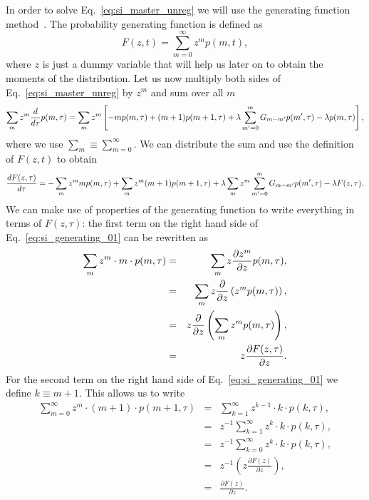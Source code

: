 In order to solve Eq.~\ref{eq:si_master_unreg} we will use the generating
function method~\cite{vanKampen2007}. The probability generating function
is defined as
\begin{equation}
F(z,t) = \sum_{m=0}^\infty z^m p(m,t),
\end{equation}
where $z$ is just a dummy variable that will help us later on to obtain the
moments of the distribution. Let us now multiply both sides of
Eq.~\ref{eq:si_master_unreg} by $z^m$ and sum over all $m$
\begin{equation}
\sum_m z^m {d \over d\tau} p(m, \tau) = 
\sum_m z^m \left[ 
- m p(m, \tau) 
+ (m + 1) p(m + 1, \tau) 
+ \lambda \sum_{m' = 0}^m G_{m-m'} p(m', \tau) - \lambda p(m, \tau)
\right],
\end{equation}
where we use $\sum_m \equiv \sum_{m=0}^\infty$. We can distribute the sum and
use the definition of $F(z, t)$ to obtain
\begin{equation}
{d F(z, \tau) \over d\tau} =
- \sum_m z^m m p(m, \tau)
+ \sum_m z^m (m + 1) p(m + 1, \tau)
+ \lambda \sum_m z^m \sum_{m'=0}^m G_{m-m'} p(m', \tau)
- \lambda F(z, \tau).
\label{eq:si_generating_01}
\end{equation}
We can make use of properties of the generating function to write everything in
terms of $F(z, \tau)$: the first term on the right hand side of
Eq.~\ref{eq:si_generating_01} can be rewritten as
\begin{eqnarray}
\sum_{m} z^{m} \cdot m \cdot p(m, \tau) &=&
\sum_{m} z \frac{\partial z^{m}}{\partial z} p(m, \tau), \\
&=&\sum_{m} z \frac{\partial}{\partial z}\left(z^{m} p(m, \tau)\right), \\
&=&z \frac{\partial}{\partial z}\left(\sum_{m} z^{m} p(m, \tau)\right), \\
&=& z {\partial F(z, \tau) \over \partial z}.
\end{eqnarray}
For the second term on the right hand side of Eq.~\ref{eq:si_generating_01} we
define $k \equiv m + 1$. This allows us to write
\begin{eqnarray}
\sum_{m=0}^{\infty} z^{m} \cdot(m+1) \cdot p(m+1, \tau) &=&
\sum_{k=1}^{\infty} z^{k-1} \cdot k \cdot p(k, \tau), \\
&=&z^{-1} \sum_{k=1}^{\infty} z^{k} \cdot k \cdot p(k, \tau), \\
&=&z^{-1} \sum_{k=0}^{\infty} z^{k} \cdot k \cdot p(k, \tau), \\
&=&z^{-1} \left(z \frac{\partial F(z)}{\partial z}\right), \\
&=&\frac{\partial F(z)}{\partial z}.
\end{eqnarray}

